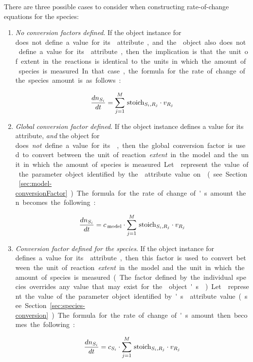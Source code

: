 There are three possible cases to consider when constructing
rate-of-change equations for the species:
\begin{enumerate}

\item \emph{No conversion factors defined}.  If the \Species
  object instance for \si does not define a value for its
   attribute, and the \Model object also
  does not define a value for its  attribute,
  then the implication is that the unit of extent in the reactions
  is identical to the units in which the amount of species \si is
  measured.  In that case, the formula for the rate of change of
  the species amount is as follows:
  \begin{linenomath}
    \begin{equation*}
      \frac{d n_{S_i}}{dt} = \sum_{j=1}^{M} \, \textrm{stoich}_{S_{i},R_{j}} \cdot v_{R_j}      
    \end{equation*}
  \end{linenomath}

\item \emph{Global conversion factor defined}.  If the \Model
  object instance defines a value for its 
  attribute, \emph{and} the \Species object for \si does
  \emph{not} define a value for its , then
  the global conversion factor is used to convert between the unit
  of reaction \emph{extent} in the model and the unit in which the
  amount of species \si is measured.  Let \csg represent the value
  of the parameter object identified by the
   attribute value on \Model (see
  Section~\ref{sec:model-conversionFactor}).  The formula for the
  rate of change of \si's amount then becomes the following:
  \begin{linenomath}
    \begin{equation*}
      \frac{d n_{S_i}}{dt} = c_{\,\textrm{model}} \cdot \sum_{j=1}^{M} \, \textrm{stoich}_{S_{i},R_{j}} \cdot v_{R_j}      
    \end{equation*}
  \end{linenomath}

\item \emph{Conversion factor defined for the species}.  If the
  \Species object instance for \si defines a value for its
   attribute, then this factor is used to
  convert between the unit of reaction \emph{extent} in the model
  and the unit in which the amount of species \si is measured.
  (The factor defined by the individual species overrides any
  value that may exist for the \Model object's
  .)  Let \csi represent the value of the
  parameter object identified by \si's 
  attribute value (see Section~\ref{sec:species-conversion}).  The
  formula for the rate of change of \si's amount then becomes the
  following:
  \begin{linenomath}
    \begin{equation*}
      \frac{d n_{S_i}}{dt} = c_{S_i} \cdot \sum_{j=1}^{M} \, \textrm{stoich}_{S_{i},R_{j}} \cdot v_{R_j}      
    \end{equation*}
  \end{linenomath}

\end{enumerate}

